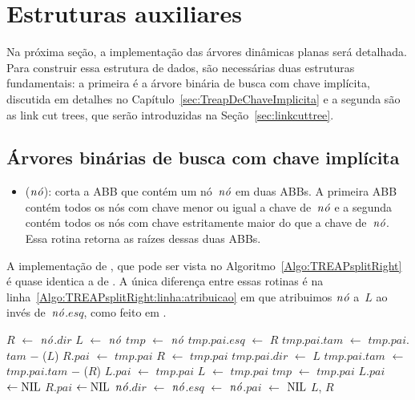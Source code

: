\section{Estruturas auxiliares}

Na próxima seção, a implementação das árvores dinâmicas planas será detalhada. Para construir essa estrutura de dados, são necessárias duas estruturas fundamentais: a primeira é a árvore binária de busca com chave implícita, discutida em detalhes no Capítulo~\ref{sec:TreapDeChaveImplicita} e a segunda são as link cut trees, que serão introduzidas na Seção~\ref{sec:linkcuttree}.



\subsection{Árvores binárias de busca com chave implícita}

\begin{itemize}
\item \treapSplitRight($\node$): corta a ABB que contém um nó~$\node$ em duas ABBs. A primeira ABB contém todos os nós com chave menor ou igual a chave de~$\node$ e a segunda contém todos os nós com chave estritamente maior do que a chave de~$\node$. Essa rotina retorna as raízes dessas duas ABBs.
\end{itemize}

A implementação de \treapSplitRight{}, que pode ser vista no Algoritmo~\ref{Algo:TREAPsplitRight} é quase identica a de \treapSplit{}.
A única diferença entre essas rotinas é na linha~\ref{Algo:TREAPsplitRight:linha:atribuicao} em que atribuimos $\node$ a~$L$ ao invés de~$\node$.$esq$, como feito em \treapSplit{}.

\begin{algorithm}
\caption{\treapSplitRight($\node$)}
\label{Algo:TREAPsplitRight}
\begin{algorithmic}[1]
\State $R$ $\gets $ $\node$.$dir$
\State $L$ $\gets $ $\node$ \label{Algo:TREAPsplitRight:linha:atribuicao}
\State $tmp$ $\gets$ $\node$
    \State $tmp$.$pai$.$esq$ $\gets$ $R$
    \State $tmp$.$pai$.$tam$ $\gets$ $tmp$.$pai$.$tam$ $\mathit{-}$ \treapGetSize($L$)
    \State $R$.$pai$ $\gets$ $tmp$.$pai$
    \EndIf
    \State $R$ $\gets$ $tmp$.$pai$
  \Else
    \State $tmp$.$pai$.$dir$ $\gets$ $L$ 
    \State $tmp$.$pai$.$tam$ $\gets$ $tmp$.$pai$.$tam$ $\mathit{-}$ \treapGetSize($R$)
    \State $L$.$pai$ $\gets$ $tmp$.$pai$
    \EndIf
    \State $L$ $\gets$ $tmp$.$pai$
  \EndIf
  \State $tmp$ $\gets$ $tmp$.$pai$
\EndWhile
{} $L$.$pai$ $\gets\text{NIL}$\EndIf
{} $R$.$pai$ $\gets\text{NIL}$\EndIf
\State $\node$.$dir$ $\gets $ $\node$.$esq$ $\gets$ $\node$.$pai$ $\gets$ $\text{NIL}$
\State\Return $L$, $R$
\end{algorithmic}
\end{algorithm}






